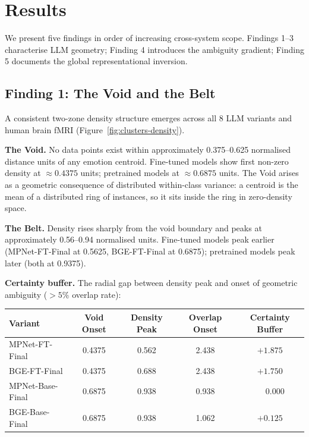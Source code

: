 \documentclass{article}
\begin{document}
\vspace{-0.5em}
\section{Results}

We present five findings in order of increasing cross-system scope.
Findings 1--3 characterise LLM geometry; Finding 4 introduces the ambiguity gradient;
Finding 5 documents the global representational inversion.
\vspace{-0.5em}

\subsection{Finding 1: The Void and the Belt}
\label{sec:finding1}

A consistent two-zone density structure emerges across all 8 LLM variants and
human brain fMRI (Figure~\ref{fig:clusters-density}).

\textbf{The Void.}
No data points exist within approximately 0.375--0.625 normalised distance units of
any emotion centroid.
Fine-tuned models show first non-zero density at $\approx\!0.4375$ units;
pretrained models at $\approx\!0.6875$ units.
The Void arises as a geometric consequence of distributed within-class variance:
a centroid is the mean of a distributed ring of instances, so it sits inside the ring
in zero-density space.

\textbf{The Belt.}
Density rises sharply from the void boundary and peaks at approximately 0.56--0.94
normalised units.
Fine-tuned models peak earlier (MPNet-FT-Final at 0.5625, BGE-FT-Final at 0.6875);
pretrained models peak later (both at 0.9375).

\textbf{Certainty buffer.}
The radial gap between density peak and onset of geometric ambiguity
($>\!5\%$ overlap rate):

\begin{center}
\small
\begin{tabular}{lcccc}
\toprule
Variant & Void Onset & Density Peak & Overlap Onset & Certainty Buffer \\
\midrule
MPNet-FT-Final  & 0.4375 & 0.562 & 2.438 & $+1.875$ \\
BGE-FT-Final    & 0.4375 & 0.688 & 2.438 & $+1.750$ \\
MPNet-Base-Final& 0.6875 & 0.938 & 0.938 & $\phantom{+}0.000$ \\
BGE-Base-Final  & 0.6875 & 0.938 & 1.062 & $+0.125$ \\
\bottomrule
\end{tabular}
\end{center}
\end{document}
